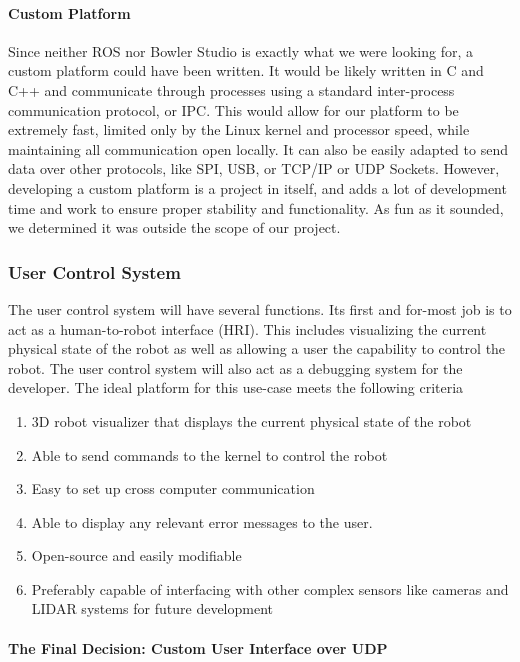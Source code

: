         \paragraph*{Custom Platform}
        Since neither ROS nor Bowler Studio is exactly what we were looking for, a custom platform could have been written. It would be likely written in C and C++ and communicate through processes using a standard inter-process communication protocol, or IPC. This would allow for our platform to be extremely fast, limited only by the Linux kernel and processor speed, while maintaining all communication open locally. It can also be easily adapted to send data over other protocols, like SPI, USB, or TCP/IP or UDP Sockets. However, developing a custom platform is a project in itself, and adds a lot of development time and work to ensure proper stability and functionality. As fun as it sounded, we determined it was outside the scope of our project.

        \subsubsection{User Control System}
        The user control system will have several functions. Its first and for-most job is to act as a human-to-robot interface (HRI). This includes visualizing the current physical state of the robot as well as allowing a user the capability to control the robot. The user control system will also act as a debugging system for the developer. The ideal platform for this use-case meets the following criteria

        \begin{enumerate}
            \item 3D robot visualizer that displays the current physical state of the robot
            \item Able to send commands to the kernel to control the robot
            \item Easy to set up cross computer communication
            \item Able to display any relevant error messages to the user.
            \item Open-source and easily modifiable
            \item Preferably capable of interfacing with other complex sensors like cameras and LIDAR systems for future development
        \end{enumerate}

        \paragraph*{The Final Decision: Custom User Interface over UDP}


